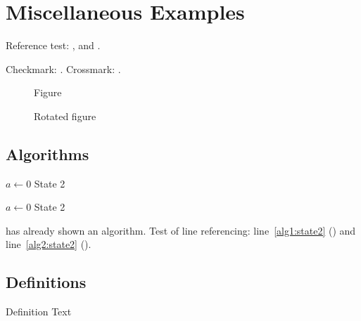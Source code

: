 \documentclass[../main-german]{subfiles}
\begin{document}
\section{Miscellaneous Examples}
\label{ssec:example}

Reference test: ,  and .

\begin{ltgexample}
Checkmark: \dingcheck.
Crossmark: \dingcross.
\end{ltgexample}

\begin{figure}
  \missingfigure{}
  \caption{Figure}
  \label{fig:Abbildung}
\end{figure}

\begin{landscape}
  \begin{figure}
    \missingfigure{}
    \caption{Rotated figure}
    \label{fig:AbbildungGedreht}
  \end{figure}
\end{landscape}

\subsection{Algorithms}

\begin{algorithm}
  \caption{$algo$}
  \label{alg:example}
  \begin{algorithmic}[1]
    \State $a \gets 0$
    \State State 2\label{alg1:state2}
  \end{algorithmic}
\end{algorithm}

\begin{algorithm}
  \caption{Algorithm 2}
  \label{alg:example2}
  \begin{algorithmic}[1]
    \State $a \gets 0$
    \State State 2\label{alg2:state2}
  \end{algorithmic}
\end{algorithm}

 has already shown an algorithm.
Test of line referencing: line~\ref{alg1:state2} () and line~\ref{alg2:state2} ().

\subsection{Definitions}
\begin{definition}[Title]
  \label{def:def1}
  Definition Text
\end{definition}
\end{document}
